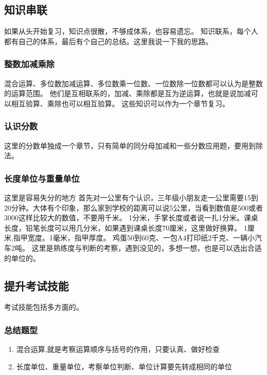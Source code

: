\documentclass[a4paper,12pt]{article}
\begin{document}
\subsection{知识串联}
如果从头开始复习，知识点很散，不够成体系，也容易遗忘。\newline
\indent 知识联系，每个人都有自己的体系，最后有个自己的总结。这里我说一下我的思路。

\subsubsection{整数加减乘除}
混合运算、多位数加减运算、多位数乘一位数、一位数除一位数都可以认为是整数的运算范围。
他们是互相联系的，加减、乘除都是互为逆运算，也就是说加减可以相互验算、乘除也可以相互验算。
这些知识可以作为一个章节复习。

\subsubsection{认识分数}
这里的分数单独成一个章节，只有简单的同分母加减和一些分数应用题，要用到除法。

\subsubsection{长度单位与重量单位}
这里是容易失分的地方\newline
首先对一公里有个认识，三年级小朋友走一公里需要15到20分钟。大体有个印象，那么家到学校的距离可以说5公里，当看到数值是500或者3000这样比较大的数值，不要用千米。\newline
1分米，手掌长度或者说一扎1分米。课桌长度，铅笔长度可以用几分米，如果遇到课桌长度70厘米，这里做好换算。\newline
1厘米,指甲宽度。1毫米，指甲厚度。\newline
鸡蛋50到60克、一包A4打印纸2千克、一辆小汽车2吨。\newline
这里是熟练度与判断的考察，遇到没见的，多想一想，也是可以选出合适的单位的。



\subsection{提升考试技能}
考试技能包括多方面的。
\subsubsection{总结题型}

\begin{enumerate}
        \item 混合运算,就是考察运算顺序与括号的作用，只要认真、做好检查
        \item 长度单位、重量单位，考察单位判断、单位计算要先转成相同的单位
\end{enumerate}
\end{document}
